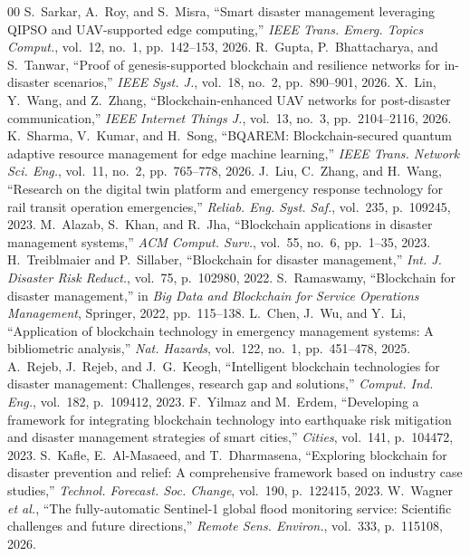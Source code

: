 \documentclass[conference]{IEEEtran}
\begin{document}
\begin{thebibliography}{00}
 S.~Sarkar, A.~Roy, and S.~Misra, ``Smart disaster management leveraging QIPSO and UAV-supported edge computing,'' \emph{IEEE Trans. Emerg. Topics Comput.}, vol.~12, no.~1, pp.~142--153, 2026.
 R.~Gupta, P.~Bhattacharya, and S.~Tanwar, ``Proof of genesis-supported blockchain and resilience networks for in-disaster scenarios,'' \emph{IEEE Syst. J.}, vol.~18, no.~2, pp.~890--901, 2026.
 X.~Lin, Y.~Wang, and Z.~Zhang, ``Blockchain-enhanced UAV networks for post-disaster communication,'' \emph{IEEE Internet Things J.}, vol.~13, no.~3, pp.~2104--2116, 2026.
 K.~Sharma, V.~Kumar, and H.~Song, ``BQAREM: Blockchain-secured quantum adaptive resource management for edge machine learning,'' \emph{IEEE Trans. Network Sci. Eng.}, vol.~11, no.~2, pp.~765--778, 2026.
 J.~Liu, C.~Zhang, and H.~Wang, ``Research on the digital twin platform and emergency response technology for rail transit operation emergencies,'' \emph{Reliab. Eng. Syst. Saf.}, vol.~235, p.~109245, 2023.
 M.~Alazab, S.~Khan, and R.~Jha, ``Blockchain applications in disaster management systems,'' \emph{ACM Comput. Surv.}, vol.~55, no.~6, pp.~1--35, 2023.
 H.~Treiblmaier and P.~Sillaber, ``Blockchain for disaster management,'' \emph{Int. J. Disaster Risk Reduct.}, vol.~75, p.~102980, 2022.
 S.~Ramaswamy, ``Blockchain for disaster management,'' in \emph{Big Data and Blockchain for Service Operations Management}, Springer, 2022, pp.~115--138.
 L.~Chen, J.~Wu, and Y.~Li, ``Application of blockchain technology in emergency management systems: A bibliometric analysis,'' \emph{Nat. Hazards}, vol.~122, no.~1, pp.~451--478, 2025.
 A.~Rejeb, J.~Rejeb, and J.~G.~Keogh, ``Intelligent blockchain technologies for disaster management: Challenges, research gap and solutions,'' \emph{Comput. Ind. Eng.}, vol.~182, p.~109412, 2023.
 F.~Yilmaz and M.~Erdem, ``Developing a framework for integrating blockchain technology into earthquake risk mitigation and disaster management strategies of smart cities,'' \emph{Cities}, vol.~141, p.~104472, 2023.
 S.~Kafle, E.~Al-Masaeed, and T.~Dharmasena, ``Exploring blockchain for disaster prevention and relief: A comprehensive framework based on industry case studies,'' \emph{Technol. Forecast. Soc. Change}, vol.~190, p.~122415, 2023.
 W.~Wagner \emph{et al.}, ``The fully-automatic Sentinel-1 global flood monitoring service: Scientific challenges and future directions,'' \emph{Remote Sens. Environ.}, vol.~333, p.~115108, 2026.

\end{thebibliography}
\end{document}
